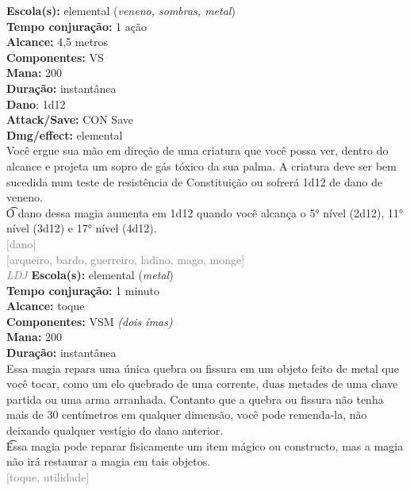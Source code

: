 \documentclass{RPG_Adventure}[2021/10/20]
\begin{document}
{\small \t \textbf{Escola(s):} elemental (\textit{veneno, sombras, metal})\\\t \textbf{Tempo conjuração:} 1 ação\\\t \textbf{Alcance:} 4,5 metros\\\t \textbf{Componentes:} VS\\\t \textbf{Mana:} 200\\\t \textbf{Duração:} instantânea\\\t \textbf{Dano}: 1d12\\\t \textbf{Attack/Save:} CON Save\\\t \textbf{Dmg/effect:} elemental\\}
{\normalsize Você ergue sua mão em direção de uma criatura que você possa ver, dentro do alcance e projeta um sopro de gás tóxico da sua palma. A criatura deve ser bem sucedida num teste de resistência de Constituição ou sofrerá 1d12 de dano de veneno.\\\t O dano dessa magia aumenta em 1d12 quando você alcança o 5° nível (2d12), 11° nível (3d12) e 17° nível (4d12).\\}
{\scriptsize \textcolor{gray}{[dano]\\}}
{\scriptsize \textcolor{gray}{[arqueiro, bardo, guerreiro, ladino, mago, monge]\\}}
{\tiny \textcolor{gray}{\textit{LDJ}}}\jump{}
{\small \t \textbf{Escola(s):} elemental (\textit{metal})\\\t \textbf{Tempo conjuração:} 1 minuto\\\t \textbf{Alcance:} toque\\\t \textbf{Componentes:} VSM \textit{(dois ímas)}\\\t \textbf{Mana:} 200\\\t \textbf{Duração:} instantânea\\}
{\normalsize Essa magia repara uma única quebra ou fissura em um objeto feito de metal que você tocar, como um elo quebrado de uma corrente, duas metades de uma chave partida ou uma arma arranhada. Contanto que a quebra ou fissura não tenha mais de 30 centímetros em qualquer dimensão, você pode remenda-la, não deixando qualquer vestígio do dano anterior.\\\t Essa magia pode reparar fisicamente um item mágico ou constructo, mas a magia não irá restaurar a magia em tais objetos.\\}
{\scriptsize \textcolor{gray}{[toque, utilidade]\\}}
\end{document}

